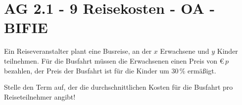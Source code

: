 \section{AG 2.1 - 9 Reisekosten - OA - BIFIE}

\begin{beispiel}[AG 2.1]{1} %
Ein Reiseveranstalter plant eine Busreise, an der $x$ Erwachsene und $y$ Kinder teilnehmen.
Für die Busfahrt müssen die Erwachsenen einen Preis von \euro\,$p$ bezahlen, der Preis der Busfahrt ist für die Kinder um 30\,\% ermäßigt. 
 \leer

Stelle den Term auf, der die durchschnittlichen Kosten für die Busfahrt pro Reiseteilnehmer angibt!

			
\end{beispiel}